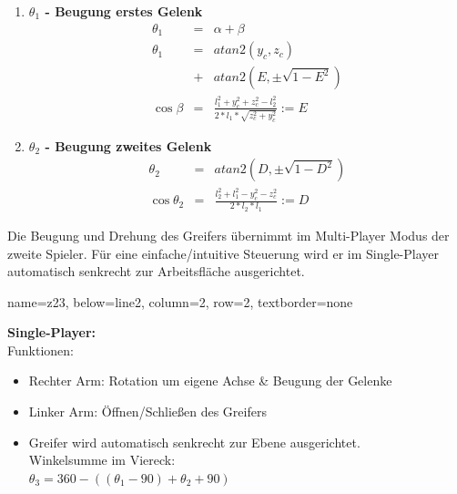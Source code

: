 \documentclass[portrait,a0paper]{baposter}
\begin{document}
\begin{poster}
{\begin{enumerate}
	\item \textbf{$\theta_1$ - Beugung erstes Gelenk}
\begin{eqnarray*}
\theta_1 &=& \alpha + \beta \\
\theta_1 &=& atan2(y_c, z_c)\\ &+& atan2(E, \pm \sqrt{1-E^2}) \\
\cos \beta &=& \frac{l_1^2 + y_c^2 + z_c^2 - l_2^2}{2*l_1*\sqrt{z_c^2 + y_c^2}} := E 
	\end{eqnarray*}

	\item \textbf{$\theta_2$ - Beugung zweites Gelenk}
\begin{eqnarray*}
\theta_2 &=& atan2(D, \pm \sqrt{1-D^2}) \\
\cos \theta_2 &=& \frac{l_2^2 + l_1^2 - y_c^2 - z_c^2}{2*l_2*l_1} :=D
\end{eqnarray*}	
\end{enumerate}
	
Die Beugung und Drehung des Greifers übernimmt im Multi-Player Modus der zweite Spieler. Für eine einfache/intuitive Steuerung wird er im Single-Player automatisch senkrecht zur Arbeitsfläche ausgerichtet.
	  



 }
    {
    name=z23,
    below=line2,
    column=2,
    row=2,
    textborder=none
    }
    {
 \textbf{Single-Player:}\vspace*{0.2cm} \\ 
Funktionen:
\begin{itemize}
\item Rechter Arm: Rotation um eigene Achse \& Beugung der Gelenke
\item Linker Arm: Öffnen/Schließen des Greifers
\item Greifer wird automatisch senkrecht zur Ebene ausgerichtet. \vspace*{0.2cm}\\
Winkelsumme im Viereck: \\ $\theta_3 = 360-((\theta_1-90)+\theta_2+90)$
\end{itemize}


}
\end{poster}
\end{document}
